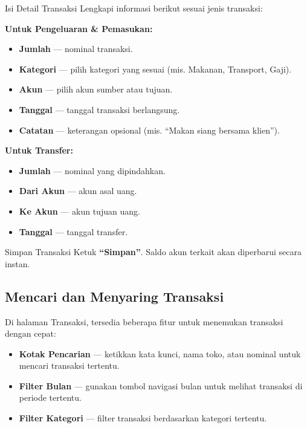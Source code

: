 \documentclass[12pt, a4paper]{article}
\begin{document}
\begin{stepbox}{Isi Detail Transaksi}
  Lengkapi informasi berikut sesuai jenis transaksi:

  \vspace{4pt}
  \textbf{Untuk Pengeluaran \& Pemasukan:}
  \begin{itemize}[leftmargin=1em, itemsep=2pt]
    \item \textbf{Jumlah} --- nominal transaksi.
    \item \textbf{Kategori} --- pilih kategori yang sesuai (mis. Makanan, Transport, Gaji).
    \item \textbf{Akun} --- pilih akun sumber atau tujuan.
    \item \textbf{Tanggal} --- tanggal transaksi berlangsung.
    \item \textbf{Catatan} --- keterangan opsional (mis. ``Makan siang bersama klien'').
  \end{itemize}

  \vspace{4pt}
  \textbf{Untuk Transfer:}
  \begin{itemize}[leftmargin=1em, itemsep=2pt]
    \item \textbf{Jumlah} --- nominal yang dipindahkan.
    \item \textbf{Dari Akun} --- akun asal uang.
    \item \textbf{Ke Akun} --- akun tujuan uang.
    \item \textbf{Tanggal} --- tanggal transfer.
  \end{itemize}
\end{stepbox}

\begin{stepbox}{Simpan Transaksi}
  Ketuk \textbf{``Simpan''}. Saldo akun terkait akan diperbarui secara instan.
\end{stepbox}

\subsection{Mencari dan Menyaring Transaksi}

Di halaman Transaksi, tersedia beberapa fitur untuk menemukan transaksi dengan cepat:

\begin{itemize}[leftmargin=1.5em, itemsep=4pt]
  \item \textbf{Kotak Pencarian} --- ketikkan kata kunci, nama toko, atau nominal untuk mencari transaksi tertentu.
  \item \textbf{Filter Bulan} --- gunakan tombol navigasi bulan untuk melihat transaksi di periode tertentu.
  \item \textbf{Filter Kategori} --- filter transaksi berdasarkan kategori tertentu.
\end{itemize}
\end{document}
